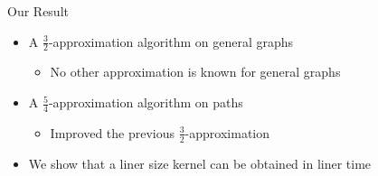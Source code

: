 \begin{frame}{Our Result}
\begin{itemize}

\item
A $\frac{3}{2}$-approximation algorithm on general graphs 
\begin{itemize}
\pause\item
No other approximation is known for general graphs 
\end{itemize}

\pause\item
A $\frac{5}{4}$-approximation algorithm on paths 
\begin{itemize}
\pause\item
Improved the previous $\frac{3}{2}$-approximation 
\end{itemize}

\pause\item
We show that a liner size kernel can be obtained in liner time



\end{itemize}
\end{frame}